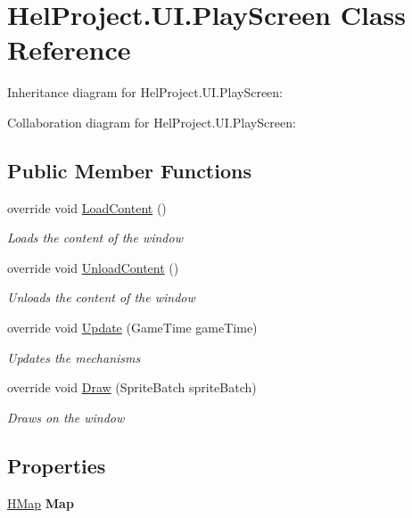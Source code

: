 \hypertarget{class_hel_project_1_1_u_i_1_1_play_screen}{}\section{Hel\+Project.\+U\+I.\+Play\+Screen Class Reference}
\label{class_hel_project_1_1_u_i_1_1_play_screen}


Inheritance diagram for Hel\+Project.\+U\+I.\+Play\+Screen\+:


Collaboration diagram for Hel\+Project.\+U\+I.\+Play\+Screen\+:
\subsection*{Public Member Functions}
\begin{DoxyCompactItemize}
\item 
override void \hyperlink{class_hel_project_1_1_u_i_1_1_play_screen_af3639840bdd8de714d262377c417ee20}{Load\+Content} ()
\begin{DoxyCompactList}\small\item\em Loads the content of the window \end{DoxyCompactList}\item 
override void \hyperlink{class_hel_project_1_1_u_i_1_1_play_screen_a90c75361ad40bff449d2a560ef8f4464}{Unload\+Content} ()
\begin{DoxyCompactList}\small\item\em Unloads the content of the window \end{DoxyCompactList}\item 
override void \hyperlink{class_hel_project_1_1_u_i_1_1_play_screen_a012a79b297f9e09a0d21dbe952a653db}{Update} (Game\+Time game\+Time)
\begin{DoxyCompactList}\small\item\em Updates the mechanisms \end{DoxyCompactList}\item 
override void \hyperlink{class_hel_project_1_1_u_i_1_1_play_screen_a0f290e8d07d6632fd53a66efc585e853}{Draw} (Sprite\+Batch sprite\+Batch)
\begin{DoxyCompactList}\small\item\em Draws on the window \end{DoxyCompactList}\end{DoxyCompactItemize}
\subsection*{Properties}
\begin{DoxyCompactItemize}
\item 
\hypertarget{class_hel_project_1_1_u_i_1_1_play_screen_ae5ad43d10a9550b116f4aff87c6a8d52}{}\hyperlink{class_hel_project_1_1_game_world_1_1_map_1_1_h_map}{H\+Map} {\bfseries Map}\label{class_hel_project_1_1_u_i_1_1_play_screen_ae5ad43d10a9550b116f4aff87c6a8d52}

\end{DoxyCompactItemize}


